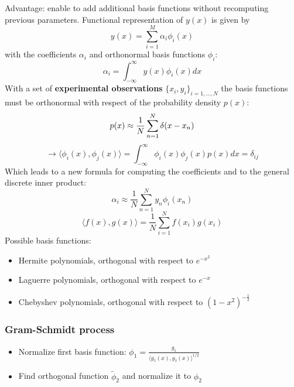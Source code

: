 \documentclass[8pt,a4paper]{scrartcl}
\renewcommand{\compaq}{\setlength{\itemsep}{0mm}\setlength{\parskip}{0cm}}
\begin{document}
\begin{multicols*}{3}
Advantage: enable to add additional basis functions without recomputing previous parameters.
Functional representation of $y(x)$ is given by
\begin{equation*}
y(x) = \sum_{i=1}^M \alpha_{i} \phi_{i} (x)
\end{equation*}
with the coefficients $\alpha_i$ and orthonormal basis functions $\phi_i$:
\begin{equation*}
\alpha_i = \int_{-\infty}^{\infty} y(x) \phi_i(x) dx
\end{equation*}
With a set of \textbf{experimental observations} $\{ x_i , y_i \}_{i = 1,\dots,N}$ the basis functions must be orthonormal with respect of the probability density $p(x)$:
\begin{equation*}
p(x) \approx \frac{1}{N} \sum_{n=1}^{N} \delta (x-x_n) \\
\end{equation*}
\begin{equation*}
\rightarrow \langle \phi_{i}(x), \phi_{j}(x) \rangle  = \int_{-\infty}^{\infty} \phi_i(x) \phi_j(x) p(x) dx = \delta_{ij}
\end{equation*}
Which leads to a new formula for computing the coefficients and to the general discrete inner product:
\begin{equation*}
\alpha_i \approx \frac{1}{N} \sum_{n=1}^{N} y_n \phi_i (x_n)
\end{equation*}
\begin{equation*}
\langle f(x), g(x) \rangle = \frac{1}{N} \sum_{i=1}^{N} f(x_i) g(x_i)
\end{equation*}
Possible basis functions:
\begin{itemize}\compaq
\item Hermite polynomials, orthogonal with respect to $e^{-x^2}$
\item Laguerre polynomials, orthogonal with respect to $e^{-x}$
\item Chebyshev polynomials, orthogonal with respect to $(1-x^2)^{-\frac{1}{2}}$
\end{itemize}

\subsubsection{Gram-Schmidt process}

\begin{itemize}
\item Normalize first basis function: $\phi_1 = \frac{g_1}{\langle g_1(x) , g_1(x) \rangle^{1/2}}$
\item Find orthogonal function $\tilde \phi_2$ and normalize it to $\phi_2$


\end{itemize}
\end{multicols*}
\end{document}
